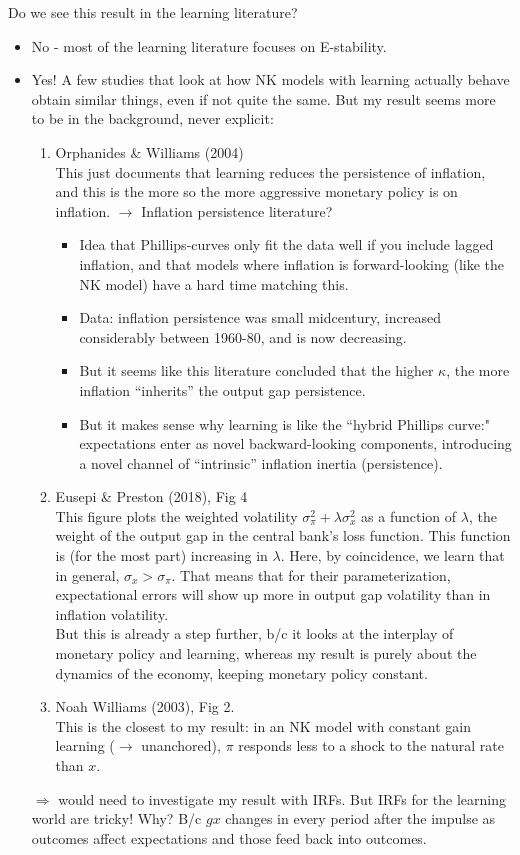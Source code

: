 \documentclass[11pt]{article}
\renewcommand{\[}{\begin{equation}}
\renewcommand{\]}{\end{equation}}
\begin{document}
	 Do we see this result in the learning literature?
		\begin{itemize}
		\item No - most of the learning literature focuses on E-stability.
		\item Yes! A few studies that look at how NK models with learning actually behave obtain similar things, even if not quite the same. But my result seems more to be in the background, never explicit:
			\begin{enumerate}
			\item Orphanides \& Williams (2004) \\
			This just documents that learning reduces the persistence of inflation, and this is the more so the more aggressive monetary policy is on inflation. $\rightarrow$
			Inflation persistence literature?
			\begin{itemize}
			\item Idea that Phillips-curves only fit the data well if you include lagged inflation, and that models where inflation is forward-looking (like the NK model) have a hard time matching this.
			\item Data: inflation persistence was small midcentury, increased considerably between 1960-80, and is now decreasing. 
			\item But it seems like this literature concluded that the higher $\kappa$, the more inflation ``inherits'' the output gap persistence. 
			\item But it makes sense why learning is like the ``hybrid Phillips curve:" expectations enter as novel backward-looking components, introducing a novel channel of ``intrinsic'' inflation inertia (persistence).
			\end{itemize}

			\item Eusepi \& Preston (2018), Fig 4 \\
			This figure plots the weighted volatility $\sigma_{\pi}^2 + \lambda \sigma_x^2$ as a function of $\lambda$, the weight of the output gap in the central bank's loss function. This function is (for the most part) increasing in $\lambda$. Here, by coincidence, we learn that in general, $\sigma_x > \sigma_{\pi}$. That means that for their parameterization, expectational errors will show up more in output gap volatility than in inflation volatility. \\ 
			But this is already a step further, b/c it looks at the interplay of monetary policy and learning, whereas my result is purely about the dynamics of the economy, keeping monetary policy constant.
			\item Noah Williams (2003), Fig 2. \\
			This is the closest to my result: in an NK model with constant gain learning ($\rightarrow$ unanchored), $\pi$ responds less to a shock to the natural rate than $x$. 
			\end{enumerate}
			$\Rightarrow$ would need to investigate my result with IRFs. But IRFs for the learning world are tricky! Why? B/c $gx$ changes in every period after the impulse as outcomes affect expectations and those feed back into outcomes. 
		\end{itemize}
\end{document}
